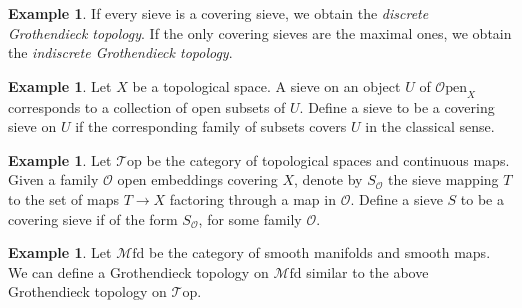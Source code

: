 \documentclass[10pt]{amsart}
\newcommand{\Top}{\mathscr{T}\mathrm{op}}
\newcommand{\Mfd}{\mathscr{M}\mathrm{fd}}
\newcommand{\Open}{\mathscr{O}\mathrm{pen}}
\theoremstyle{definition}
\newtheorem{example}[equation]{Example}
\theoremstyle{remark}
\begin{document}
	\begin{example}If every sieve is a covering sieve, we obtain the \emph{discrete Grothendieck topology}. If the only covering sieves are the maximal ones, we obtain the \textit{indiscrete Grothendieck topology}.
	\end{example}
	\begin{example}
		Let $X$ be a topological space. A sieve on an object $U$ of $\Open_X$ corresponds to a collection of open subsets of $U$. Define a sieve to be a covering sieve on $U$ if the corresponding family of subsets covers $U$ in the classical sense.
	\end{example}
	\begin{example}
		Let $\Top$ be the category of topological spaces and continuous maps. Given a family $\mathscr O$ open embeddings covering $X$, denote by $S_\mathscr O$ the sieve mapping $T$ to the set of maps $T\rightarrow X$ factoring through a map in $\mathscr O$. Define a sieve $S$ to be a covering sieve if of the form $S_\mathscr O$, for some family $\mathscr O$. 
	\end{example}
	\begin{example}Let $\Mfd$ be the category of smooth manifolds and smooth maps. We can define a Grothendieck topology on $\Mfd$ similar to the above Grothendieck topology on $\Top$. 
	\end{example}
	
\end{document}
